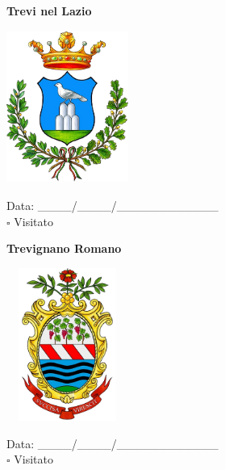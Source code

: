 \documentclass[a5paper,12pt]{article}
\begin{document}
\newpage

\noindent
\begin{minipage}[t]{0.45\textwidth}
    \begin{center}
        \textbf{Trevi nel Lazio}
    \end{center}
    \vspace{-0.5cm} %
    \begin{center}
        \includegraphics[height= 5cm, width=4cm]{Lazio/Stemma Trevi nel Lazio.png}
    \end{center}
    \vspace{-0.4cm} %
    \begin{flushleft}
        Data: \_\_\_\_/\_\_\_\_/\_\_\_\_\_\_\_\_\_\_\_\_ \\
        $\square$ Visitato
    \end{flushleft}
\end{minipage}
\hfill
\noindent
\begin{minipage}[t]{0.45\textwidth}
    \begin{center}
        \textbf{Trevignano Romano}
    \end{center}
    \vspace{-0.5cm} %
    \begin{center}
        \includegraphics[height= 5cm, width=4cm]{Lazio/Stemma Trevignano Romano.png}
    \end{center}
    \vspace{-0.4cm} %
    \begin{flushleft}
        Data: \_\_\_\_/\_\_\_\_/\_\_\_\_\_\_\_\_\_\_\_\_ \\
        $\square$ Visitato
    \end{flushleft}
\end{minipage}
\end{document}
